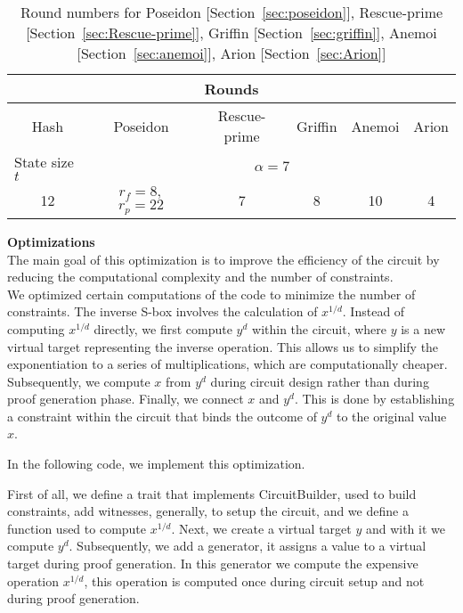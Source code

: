 \begin{table}[htbp]
  \centering
  \begin{tabular}{@{}cccccc@{}}
  \toprule
  \multicolumn{6}{c}{Rounds}                                           \\ \midrule
  \multicolumn{1}{c|}{Hash} &
    \multicolumn{1}{c|}{Poseidon} &
    \multicolumn{1}{c|}{Rescue-prime} &
    \multicolumn{1}{c|}{Griffin} &
    \multicolumn{1}{c|}{Anemoi} &
    \multicolumn{1}{c|}{Arion} \\ \midrule
  \multicolumn{1}{l|}{State size $t$} & \multicolumn{5}{c}{$\alpha=7$} \\ \midrule
  \multicolumn{1}{c|}{12} &
    \multicolumn{1}{c|}{$r_f=8,$ $r_p=22$} &
    \multicolumn{1}{c|}{7} &
    \multicolumn{1}{c|}{8} &
    \multicolumn{1}{c|}{10} &
    \multicolumn{1}{c|}{4} \\ \bottomrule
  \end{tabular}
  \caption{Round numbers for Poseidon [Section~\ref{sec:poseidon}], Rescue-prime [Section~\ref{sec:Rescue-prime}], Griffin [Section~\ref{sec:griffin}], Anemoi [Section~\ref{sec:anemoi}], Arion [Section~\ref{sec:Arion}]}
  \label{tab:goldi-rounds}
  \end{table}

\textbf{Optimizations}\\
The main goal of this optimization is to improve the efficiency of the circuit by reducing the computational complexity and the number of constraints.\\
We optimized certain computations of the code to minimize the number of constraints. The inverse S-box involves the calculation of $x^{1/d}$. Instead of computing $x^{1/d}$ directly, we first compute $y^d$ within the circuit, where $y$ is a new virtual target representing the inverse operation. This allows us to simplify the exponentiation to a series of multiplications, which are computationally cheaper.\\
Subsequently, we compute $x$ from $y^d$ during circuit design rather than during proof generation phase. Finally, we connect $x$ and $y^d$. This is done by establishing a constraint within the circuit that binds the outcome of $y^d$ to the original value $x$.

In the following code, we implement this optimization.

First of all, we define a trait that implements CircuitBuilder, used to build constraints, add witnesses, generally, to setup the circuit, and we define a function used to compute $x^{1/d}$. Next, we create a virtual target $y$ and with it we compute $y^d$. Subsequently, we add a generator, it assigns a value to a virtual target during proof generation. In this generator we compute the expensive operation $x^{1/d}$, this operation is computed once during circuit setup and not during proof generation.

